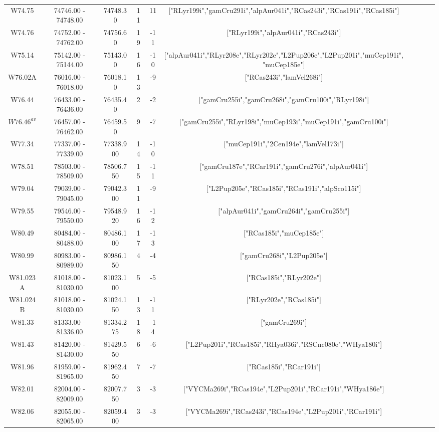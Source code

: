 \documentclass{article}
\begin{document}
\begin{table}
{\begin{tabular}{|c|c|c|c|c|c|c|c|c|c|}
W74.75 & 74746.00 - 74748.00 & 74748.30 & 11 & 11 & ["RLyr199i","gamCru291i","alpAur041i","RCas243i","RCas191i","RCas185i"] \\
W74.76 & 74752.00 - 74762.00 & 74756.60 & 19 & -11 & ["RLyr199i","alpAur041i","RCas243i"]\\
W75.14 & 75142.00 - 75144.00 & 75143.00 & 16 & -10 & ["alpAur041i","RLyr208e","RLyr202e","L2Pup206e","L2Pup201i","muCep191i","muCep185e"] \\
W76.02A & 76016.00 - 76018.00 & 76018.10 & 13 & -9 & ["RCas243i","lamVel268i"]\\
W76.44 & 76433.00 - 76436.00 & 76435.40 & 2 & -2 & ["gamCru255i","gamCru268i","gamCru100i","RLyr198i"] \\
$W76.46^{av}$ & 76457.00 - 76462.00 & 76459.50 & 9 & -7 &  ["gamCru255i","RLyr198i","muCep193i","muCep191i","gamCru100i"] \\
W77.34 & 77337.00 - 77339.00 & 77338.900 & 14 & -10 & ["muCep191i","2Cen194e","lamVel173i"] \\
W78.51 & 78503.00 - 78509.00 & 78506.750 & 15 & -11 & ["gamCru187e","RCar191i","gamCru276i","alpAur041i"]\\
W79.04 & 79039.00 - 79045.00 & 79042.300 & 11 & -9 & ["L2Pup205e","RCas185i","RCas191i","alpSco115i"]\\
W79.55 & 79546.00 - 79550.00 & 79548.920 & 16 & -12 & ["alpAur041i","gamCru264i","gamCru255i"]\\
W80.49 & 80484.00 - 80488.00 & 80486.100 & 17 & -13 & ["RCas185i","muCep185e"]\\
W80.99 & 80983.00 - 80989.00 & 80986.150 & 4 & -4 & ["gamCru268i","L2Pup205e"]\\
W81.023A & 81018.00 - 81030.00 & 81023.100 & 5 & -5 & ["RCas185i","RLyr202e"]\\
W81.024B & 81018.00 - 81030.00 & 81024.150 & 13 & -11 & ["RLyr202e","RCas185i"]\\
W81.33 & 81333.00 - 81336.00 & 81334.275 & 18 & -14 & ["gamCru269i"]\\
W81.43 & 81420.00 - 81430.00 & 81429.550 & 6 & -6 & ["L2Pup201i","RCas185i","RHya036i","RSCnc080e","WHya180i"]\\
W81.96 & 81959.00 - 81965.00 & 81962.450 & 7 & -7 & ["RCas185i","RCar191i"]\\
W82.01 & 82004.00 - 82009.00 & 82007.750 & 3 & -3 & ["VYCMa269i","RCas194e","L2Pup201i","RCar191i","WHya186e"]\\
W82.06 & 82055.00 - 82065.00 & 82059.400 & 3 & -3 & ["VYCMa269i","RCas243i","RCas194e","L2Pup201i","RCar191i"]\\

\end{tabular}}
\end{table}
\end{document}
